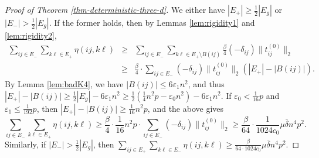 \begin{proof}[Proof of Theorem \ref{thm-deterministic-three-d}]
We either have $|E_{+}|\ge\frac{1}{2}|E_{g}|$ or $|E_{-}|>\frac{1}{2}|E_{g}|$.
If the former holds, then by Lemmas \ref{lem:rigidity1} and \ref{lem:rigidity2},
\begin{eqnarray*}
\sum_{ij\in E_{-}}\sum_{k\ell\in E_{+}}\eta(ij,k\ell) & \ge & \sum_{ij\in E_{-}}\sum_{k\ell\in E_{+}\setminus B(ij)}\frac{\beta}{4}(-\delta_{ij})\|t_{ij}^{(0)}\|_2\\
 & \ge & \frac{\beta}{4}\cdot\sum_{ij\in E_{-}}(-\delta_{ij})\|t_{ij}^{(0)}\|_2(|E_{+}|-|B(ij)|).
\end{eqnarray*}
By Lemma \ref{lem:badK4}, we have $|B(ij)|\le6\varepsilon_{1}n^{2}$,
and thus $|E_{+}|-|B(ij)|\ge\frac{1}{2}|E_{g}|-6\varepsilon_{1}n^{2}\ge\frac{1}{2}(\frac{1}{4}n^{2}p-\varepsilon_{0}n^{2})-6\varepsilon_{1}n^{2}$.
If $\varepsilon_0<\frac{1}{16}p$ and $\varepsilon_{1}\le\frac{1}{192}p$, then
$|E_{+}|-|B(ij)|\ge\frac{1}{16}n^{2}p$, and the above gives
\[
	\sum_{ij\in E_{-}}\sum_{k\ell\in E_{+}}\eta(ij,k\ell)
	\ge\frac{\beta}{4}\cdot\frac{1}{16}n^{2}p\cdot\sum_{ij\in E_{-}}(-\delta_{ij})\|t_{ij}^{(0)}\|_2
	\ge\frac{\beta}{64}\cdot\frac{1}{1024c_0}\mu\overline{\delta}n^{4}p^{2}.
\]
Similarly, if $|E_{-}|>\frac{1}{2}|E_{g}|$, then $\sum_{ij\in E_{+}}\sum_{k\ell\in E_{-}}\eta(ij,k\ell)\ge\frac{\beta}{64\cdot1024c_0}\mu\overline{\delta}n^{4}p^{2}$.


\end{proof}
